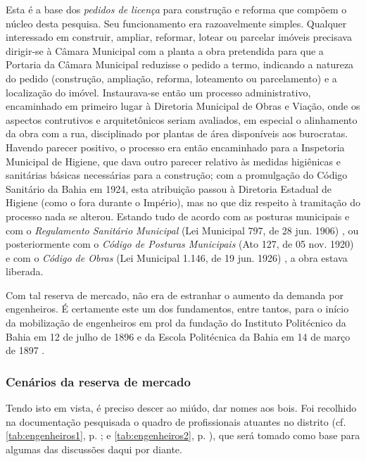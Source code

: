 Esta é a base dos \textit{pedidos de licença} para construção e reforma que compõem o núcleo desta pesquisa. Seu funcionamento era razoavelmente simples. Qualquer interessado em construir, ampliar, reformar, lotear ou parcelar imóveis precisava dirigir-se à Câmara Municipal com a planta a obra pretendida para que a Portaria da Câmara Municipal reduzisse o pedido a termo, indicando a natureza do pedido (construção, ampliação, reforma, loteamento ou parcelamento) e a localização do imóvel. Instaurava-se então um processo administrativo, encaminhado em primeiro lugar à Diretoria Municipal de Obras e Viação, onde os aspectos contrutivos e arquitetônicos seriam avaliados, em especial o alinhamento da obra com a rua, disciplinado por plantas de área disponíveis aos burocratas. Havendo parecer positivo, o processo era então encaminhado para a Inspetoria Municipal de Higiene, que dava outro parecer relativo às medidas higiênicas e sanitárias básicas necessárias para a construção; com a promulgação do Código Sanitário da Bahia em 1924, esta atribuição passou à Diretoria Estadual de Higiene (como o fora durante o Império), mas no que diz respeito à tramitação do processo nada se alterou. Estando tudo de acordo com as posturas municipais e com o \textit{Regulamento Sanitário Municipal} (Lei Municipal 797, de 28 jun. 1906) \cite{prefeitura_sanitario_1906}, ou posteriormente com o \textit{Código de Posturas Municipais} (Ato 127, de 05 nov. 1920) \cite{PREFEITURA1921} e com o \textit{Código de Obras} (Lei Municipal 1.146, de 19 jun. 1926) \cite{prefeitura_obras_1927}, a obra estava liberada.

Com tal reserva de mercado, não era de estranhar o aumento da demanda por engenheiros. É certamente este um dos fundamentos, entre tantos, para o início da mobilização de engenheiros em prol da fundação do Instituto Politécnico da Bahia em 12 de julho de 1896 e da Escola Politécnica da Bahia em 14 de março de 1897 \cite[pp.~9-11]{costa_politecnica_2005}. 

\subsubsection{Cenários da reserva de mercado}\label{subsubsec:cenresermerc}

Tendo isto em vista, é preciso descer ao miúdo, dar nomes aos bois. Foi recolhido na documentação pesquisada o quadro de profissionais atuantes no distrito (cf. \autoref{tab:engenheiros1}, p. \pageref{tab:engenheiros1}; e \autoref{tab:engenheiros2}, p. \pageref{tab:engenheiros2}), que será tomado como base para algumas das discussões daqui por diante.


